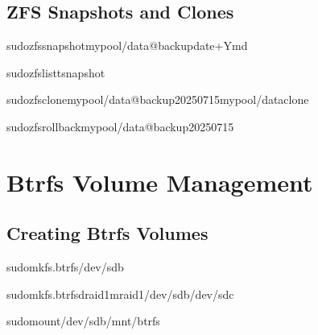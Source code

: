 \documentclass[letterpaper,10pt,english]{sphinxmanual}
\begin{document}
\subsection{ZFS Snapshots and Clones}
\label{\detokenize{volume-management:zfs-snapshots-and-clones}}
\begin{sphinxVerbatim}[commandchars=\\\{\}]
sudozfssnapshotmypool/data@backup\PYGZhy{}date+\PYGZpc{}Y\PYGZpc{}m\PYGZpc{}d

sudozfslist\PYGZhy{}tsnapshot

sudozfsclonemypool/data@backup\PYGZhy{}20250715mypool/data\PYGZhy{}clone

sudozfsrollbackmypool/data@backup\PYGZhy{}20250715
\end{sphinxVerbatim}


\section{Btrfs Volume Management}
\label{\detokenize{volume-management:btrfs-volume-management}}

\subsection{Creating Btrfs Volumes}
\label{\detokenize{volume-management:creating-btrfs-volumes}}
\begin{sphinxVerbatim}[commandchars=\\\{\}]
sudomkfs.btrfs/dev/sdb

sudomkfs.btrfs\PYGZhy{}draid1\PYGZhy{}mraid1/dev/sdb/dev/sdc

sudomount/dev/sdb/mnt/btrfs
\end{sphinxVerbatim}
\end{document}
